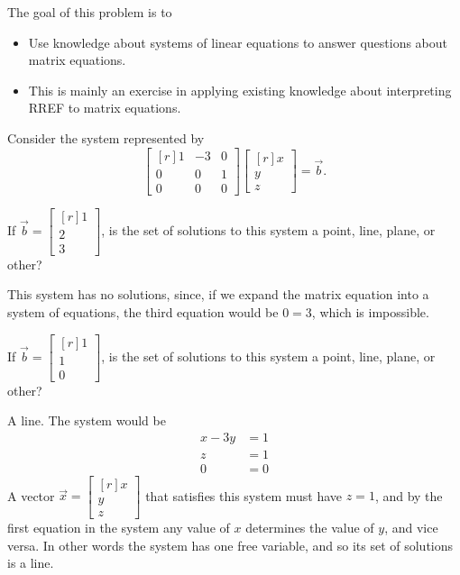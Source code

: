 \documentclass{problemset}
\newcommand{\mat}[1]{\begin{bmatrix*}[r]#1\end{bmatrix*}}
\begin{document}
	\question
	\begin{annotation}
		\begin{goals}

			The goal of this problem is to
			\begin{itemize}
				\item Use knowledge about systems of linear equations to answer questions
					about matrix equations.
			\end{itemize}
		\end{goals}

		\begin{notes}
			\begin{itemize}
				\item This is mainly an exercise in applying existing knowledge about
					interpreting RREF to matrix equations.
			\end{itemize}
		\end{notes}
	\end{annotation}
	Consider the system represented by
	\[
		\mat{1&-3&0\\0&0&1\\0&0&0}\mat{x\\y\\z}=\vec b.
	\]
	\begin{parts}
		\item If $\vec b=\mat{1\\2\\3}$, is the set of solutions to this system
			a point, line, plane, or other?
			\begin{solution}
				This system has no solutions, since, if we expand the matrix
				equation into a system of equations, the third equation would be
				$0=3$, which is impossible.
			\end{solution}
		\item If $\vec b=\mat{1\\1\\0}$, is the set of solutions to this system
			a point, line, plane, or other?
			\begin{solution}
				A line. The system would be
				\begin{align*}
					x - 3y &= 1 \\
					z &= 1 \\
					0 &= 0
				\end{align*}
				A vector $\vec x=\mat{x\\y\\z}$ that satisfies this system must have
				$z=1$, and by the first equation in the system any value of $x$
				determines the value of $y$, and vice versa. In other words the
				system has one free variable, and so its set of solutions is a line.
			\end{solution}
	\end{parts}
\end{document}

